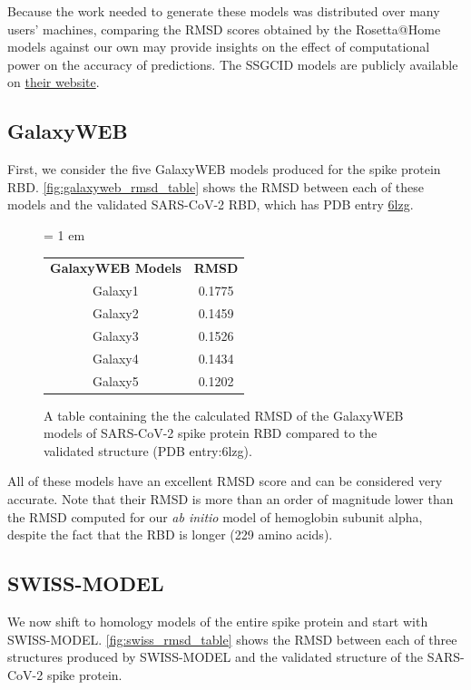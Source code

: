 Because the work needed to generate these models was distributed over many users' machines, comparing the RMSD scores obtained by the Rosetta@Home models against our own may provide insights on the effect of computational power on the accuracy of predictions. The SSGCID models are publicly available on \href{https://www.ssgcid.org/cttdb/molecularmodel_list/?target__icontains=BewuA}{their website}.

\FloatBarrier
{}
\subsection{GalaxyWEB}

First, we consider the five GalaxyWEB models produced for the spike protein RBD. \autoref{fig:galaxyweb_rmsd_table} shows the RMSD between each of these models and the validated SARS-CoV-2 RBD, which has PDB entry \href{https://www.rcsb.org/structure/6lzg}{6lzg}.\\

\begin{figure}[h]
	\centering
	\tabcolsep = 1 em
	\mySfFamily
	\begin{tabular}{c c}
		\textbf{GalaxyWEB Models} & \textbf{RMSD} \\
		Galaxy1 & 0.1775 \\
		Galaxy2 & 0.1459 \\
		Galaxy3 & 0.1526 \\
		Galaxy4 & 0.1434 \\
		Galaxy5 & 0.1202 \\
	\end{tabular}
	\caption{A table containing the the calculated RMSD of the GalaxyWEB models of SARS-CoV-2 spike protein RBD compared to the validated structure (PDB entry:6lzg).}
	\label{fig:galaxyweb_rmsd_table}
\end{figure}

All of these models have an excellent RMSD score and can be considered very accurate. Note that their RMSD is more than an order of magnitude lower than the RMSD computed for our \textit{ab initio} model of hemoglobin subunit alpha, despite the fact that the RBD is longer (229 amino acids).

\FloatBarrier
{}
\subsection{SWISS-MODEL}

We now shift to homology models of the entire spike protein and start with SWISS-MODEL. \autoref{fig:swiss_rmsd_table} shows the RMSD between each of three structures produced by SWISS-MODEL and the validated structure of the SARS-CoV-2 spike protein.\\

